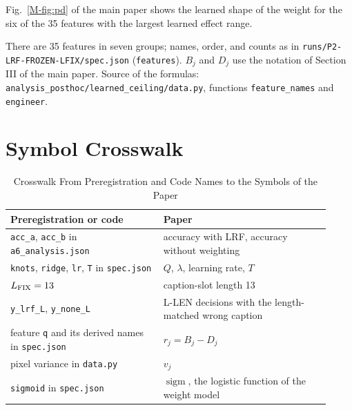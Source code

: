 \documentclass[journal,onecolumn]{IEEEtran}
\theoremstyle{plain}
\begin{document}
Fig.~\ref{M-fig:pd} of the main paper shows the learned shape of the weight for the six of the 35 features with the largest learned effect range.

\begin{table}[!htbp]
\centering
\caption{Input Features of the Frozen Weight Model, by Name, Group, and Formula}
\label{stab:features}
\scriptsize
\setlength{\tabcolsep}{3pt}


\vspace{2pt}
\parbox{\textwidth}{\scriptsize There are 35 features in seven groups; names, order, and counts as in \nolinkurl{runs/P2-LRF-FROZEN-LFIX/spec.json}
(\nolinkurl{features}). $B_j$ and $D_j$ use the notation of Section III of the main paper. Source of the formulas:
\nolinkurl{analysis_posthoc/learned_ceiling/data.py}, functions \nolinkurl{feature_names} and \nolinkurl{engineer}.}
\end{table}

\section{Symbol Crosswalk}\label{sup:crosswalk}
\begin{table}[!htbp]
\centering
\caption{Crosswalk From Preregistration and Code Names to the Symbols of the Paper}
\label{stab:crosswalk}
\footnotesize
\begin{tabular}{p{0.44\linewidth}p{0.48\linewidth}}
\toprule
Preregistration or code & Paper \\
\midrule
\texttt{acc\_a}, \texttt{acc\_b} in \texttt{a6\_analysis.json} & accuracy with LRF, accuracy without weighting \\
\texttt{knots}, \texttt{ridge}, \texttt{lr}, \texttt{T} in \texttt{spec.json} & $Q$, $\lambda$, learning rate, $T$ \\
$L_{\rm FIX}=13$ & caption-slot length 13 \\
\texttt{y\_lrf\_L}, \texttt{y\_none\_L} & L-LEN decisions with the length-matched wrong caption \\
feature \texttt{q} and its derived names in \texttt{spec.json} & $r_j=B_j-D_j$ \\
pixel variance in \texttt{data.py} & $v_j$ \\
\texttt{sigmoid} in \texttt{spec.json} & $\operatorname{sigm}$, the logistic function of the weight model \\
\bottomrule
\end{tabular}
\end{table}
\end{document}
